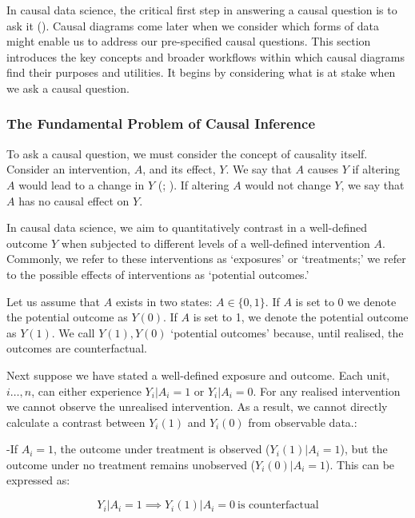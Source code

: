 \documentclass[
  singlecolumn,
  9pt]{article}
\begin{document}
In causal data science, the critical first step in answering a causal
question is to ask it (). Causal diagrams come later when we consider which forms of data
might enable us to address our pre-specified causal questions. This
section introduces the key concepts and broader workflows within which
causal diagrams find their purposes and utilities. It begins by
considering what is at stake when we ask a causal question.

\subsubsection{The Fundamental Problem of Causal
Inference}\label{the-fundamental-problem-of-causal-inference}

To ask a causal question, we must consider the concept of causality
itself. Consider an intervention, \(A\), and its effect, \(Y\). We say
that \(A\) causes \(Y\) if altering \(A\) would lead to a change in
\(Y\) (;
). If altering \(A\) would not
change \(Y\), we say that \(A\) has no causal effect on \(Y\).

In causal data science, we aim to quantitatively contrast in a
well-defined outcome \(Y\) when subjected to different levels of a
well-defined intervention \(A\). Commonly, we refer to these
interventions as `exposures' or `treatments;' we refer to the possible
effects of interventions as `potential outcomes.'

Let us assume that \(A\) exists in two states: \(A \in \{0,1\}\). If
\(A\) is set to \(0\) we denote the potential outcome as \(Y(0)\). If
\(A\) is set to 1, we denote the potential outcome as \(Y(1)\). We call
\(Y(1), Y(0)\) `potential outcomes' because, until realised, the
outcomes are counterfactual.

Next suppose we have stated a well-defined exposure and outcome. Each
unit, \(i \dots, n\), can either experience \(Y_i|A_i = 1\) or
\(Y_i|A_i = 0\). For any realised intervention we cannot observe the
unrealised intervention. As a result, we cannot directly calculate a
contrast between \(Y_i(1)\) and \(Y_i(0)\) from observable data.:

-If \(A_i = 1\), the outcome under treatment is observed
(\(Y_i(1)|A_i=1\)), but the outcome under no treatment remains
unobserved (\(Y_i(0)|A_i=1\)). This can be expressed as:

\[
Y_i|A_i = 1 \implies Y_i(1)|A_i=0~ \text{is counterfactual}
\]
\end{document}
